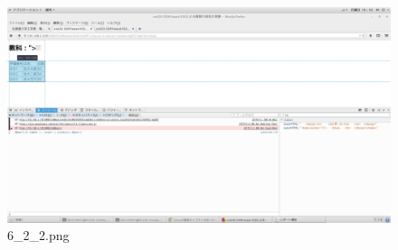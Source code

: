 \documentclass[a4j]{jarticle}
\begin{document}
  \vspace{1cm}
  \begin{figure}[htbp]
    \centering
    \includegraphics[width=13cm]{../webapp/png/6_2_2.png}
    \caption{6\_2\_2.png}
  \end{figure}
\end{document}
